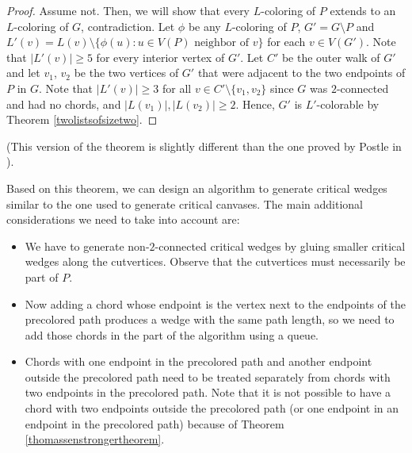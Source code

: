 \begin{proof}
Assume not. Then, we will show that every $L$-coloring of $P$ extends to an $L$-coloring of $G$, contradiction. Let $\phi$ be any $L$-coloring of $P$, 
$G' = G \setminus P$ and $L'(v) = L(v) \setminus \{\phi(u) : u \in V(P) \text{ neighbor of } v \}$ for each $v \in V(G')$. 
Note that $|L'(v)| \geq 5$ for every interior vertex of $G'$. Let $C'$ be the outer walk of $G'$ and let $v_1$, $v_2$ be the two vertices of 
$G'$ that were adjacent to the two endpoints of $P$ in $G$. Note that $|L'(v)| \geq 3$ for all $v \in C' \setminus \{v_1, v_2\}$ since 
$G$ was $2$-connected and had no chords, and $|L(v_1)|, |L(v_2)| \geq 2$. Hence, $G'$ is $L'$-colorable by Theorem \ref{twolistsofsizetwo}.
\end{proof}

(This version of the theorem is slightly different than the one proved by Postle in \cite{postlethesis}).

Based on this theorem, we can design an algorithm to generate critical wedges similar to the one used to generate critical canvases.  
The main additional considerations we need to take into account are:

\begin{itemize}
	\item We have to generate non-$2$-connected critical wedges by gluing smaller critical wedges along the cutvertices.
	 Observe that the cutvertices must necessarily be part of $P$.
	\item Now adding a chord whose endpoint is the vertex next to the endpoints of the precolored path produces a wedge
	with the same path length, so we need to add those chords in the part of the algorithm using a queue.
	\item Chords with one endpoint in the precolored path and another endpoint outside the precolored path
	need to be treated separately from chords with two endpoints in the precolored path.
	Note that it is not possible to have a chord with two endpoints outside the precolored path (or one endpoint
	in an endpoint in the precolored path) because of Theorem \ref{thomassenstrongertheorem}.
\end{itemize}



